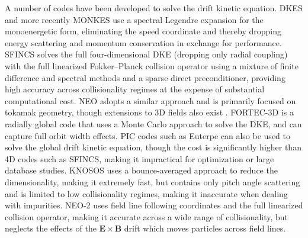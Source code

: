 \documentclass[11pt]{article}
\begin{document}
A number of codes have been developed to solve the drift kinetic equation.
DKES \cite{hirshman_plasma_1986, van_rij_variational_1989,
shaing_bootstrap_1989} and more recently MONKES \cite{escoto_monkes_2024} use a
spectral Legendre expansion
for the monoenergetic form, eliminating the speed coordinate and thereby
dropping energy scattering and momentum conservation in exchange for
performance. SFINCS \cite{landreman_comparison_2014} solves the full
four-dimensional DKE (dropping only radial coupling) with the full linearized
Fokker--Planck collision operator using a mixture of finite difference and spectral
methods and a sparse direct preconditioner, providing high accuracy across
collisionality regimes at the expense of substantial computational cost. NEO
\cite{belli_eulerian_2009, belli_full_2012, belli_kinetic_2008} adopts a
similar approach and is primarily focused on tokamak geometry, though
extensions to 3D fields also exist \cite{belli_neoclassical_2015}. FORTEC-3D
\cite{satake_non-local_2006, satake_development_2008} is a radially
global code that uses a Monte Carlo approach to solve the DKE, and can capture
full orbit width effects. PIC codes such as Euterpe \cite{kleiber_euterpe_2024,
kuczynski_self-consistent_2024} can also be used to
solve the global drift kinetic equation, though the cost is significantly
higher than 4D codes such as SFINCS, making it impractical for optimization or
large database studies. KNOSOS \cite{velasco_knosos_2020} uses a bounce-averaged
approach to
reduce the dimensionality, making it extremely fast, but contains only pitch
angle scattering and is limited to low collisionality regimes, making it
inaccurate when dealing with impurities. NEO-2 \cite{kernbichler_solution_2016,
kernbichler_recent_2008} uses field line
following coordinates and the full linearized collision operator, making it
accurate across a wide range of collisionality, but neglects the effects of the
$\mathbf{E} \times \mathbf{B}$ drift which moves particles across field lines.
\end{document}
